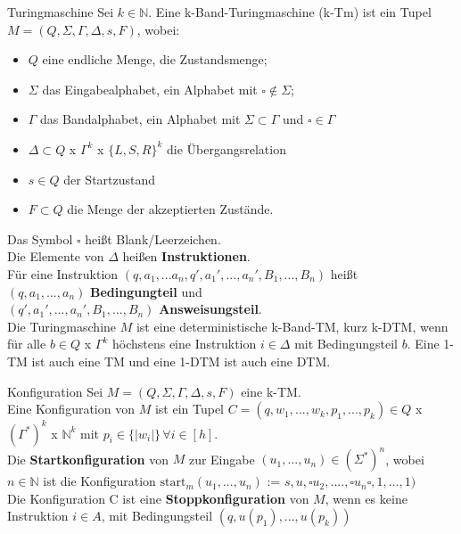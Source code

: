 \begin{defn}{Turingmaschine} 
    Sei $k \in \mathbb{N}$. Eine k-Band-Turingmaschine (k-Tm) ist ein Tupel $M = (Q, \Sigma, \Gamma, \Delta,s,F)$, wobei:
    \begin{itemize}
        \item $Q$ eine endliche Menge, die Zustandsmenge;
        \item $\Sigma$ das Eingabealphabet, ein Alphabet mit $\square \notin \Sigma$;
        \item $\Gamma$ das Bandalphabet, ein Alphabet mit $\Sigma \subset \Gamma$ und $\square \in \Gamma$
        \item $\Delta \subset Q$ x $\Gamma^k$ x $\{L,S,R\}^k$ die Übergangsrelation
        \item $s \in Q$ der Startzustand
        \item $F \subset Q$ die Menge der akzeptierten Zustände.
    \end{itemize}

    \vspace{1em}

    Das Symbol $\square$ heißt Blank/Leerzeichen. \\

    Die Elemente von $\Delta$ heißen \textbf{Instruktionen}. \\
    Für eine Instruktion $(q,a_1,...a_n,q',a_1',...,a_n',B_1,...,B_n)$ heißt \\
    $(q,a_1,...,a_n)$ \textbf{Bedingungteil} und \\
    $(q',a_1',...,a_n',B_1,...,B_n)$ \textbf{Answeisungsteil}. \\

    Die Turingmaschine $M$ ist eine deterministische k-Band-TM, kurz k-DTM, wenn für alle $b \in Q$ x $\Gamma^k$ höchstens eine Instruktion $i \in \Delta$ mit Bedingungsteil $b$.
    Eine 1-TM ist auch eine TM und eine 1-DTM ist auch eine DTM.
\end{defn}

\begin{defn}{Konfiguration}
    Sei $M = (Q, \Sigma, \Gamma, \Delta, s, F)$ eine k-TM. \\

    Eine Konfiguration von $M$ ist ein Tupel $C = (q,w_1,...,w_k,p_1,...,p_k) \in Q$ x $(\Gamma^*)^k$ x $\mathbb{N}^k$ mit $p_i \in \{| w_i |\} \, \forall i \in [h]$. \\

    Die \textbf{Startkonfiguration} von $M$ zur Eingabe $(u_1,...,u_n)\in(\Sigma^*)^n$, wobei $n\in\mathbb{N}$ ist die Konfiguration $\text{start}_m(u_1,...,u_n)$ := $s, u,\square u_2,....,\square u_n \square, 1,...,1)$ \\

    Die Konfiguration C ist eine \textbf{Stoppkonfiguration} von $M$, wenn es keine Instruktion $i \in A$, mit Bedingungsteil $(q, u(p_1),...,u(p_k))$
\end{defn}

